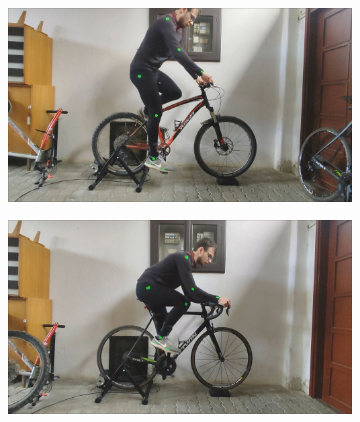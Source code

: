 \begin{figure}[htbp]
    \begin{subfigure}[b]{\imgwidth}
        \centering

        \includegraphics[width=1\linewidth]{obrazky-figures/4.jpg}

    \end{subfigure}
    \hfill
    \begin{subfigure}[b]{\imgwidth}
        \centering

        \includegraphics[width=1\linewidth]{obrazky-figures/5.jpg}

    \end{subfigure}
    \hfill
    \begin{subfigure}[b]{\imgwidth}
        \centering


\end{subfigure}
\end{figure}
